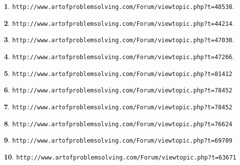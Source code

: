 \documentclass{article}
\theoremstyle{definition}
\newtheorem{s}{}
\begin{document}
	
	
	
	\begin{s}
		\texttt{http://www.artofproblemsolving.com/Forum/viewtopic.php?t=48538}.
	\end{s}
	
	
	
	
	\begin{s}
		\texttt{http://www.artofproblemsolving.com/Forum/viewtopic.php?t=44214}.
	\end{s}
	
	
	
	
	\begin{s}
		\texttt{http://www.artofproblemsolving.com/Forum/viewtopic.php?t=47030}.
	\end{s}
	
	
	
	
	\begin{s}
		\texttt{http://www.artofproblemsolving.com/Forum/viewtopic.php?t=47266}.
	\end{s}
	
	
	
	\begin{s}
		\texttt{http://www.artofproblemsolving.com/Forum/viewtopic.php?t=81412}
	\end{s}
	
	
	
	\begin{s}
		\texttt{http://www.artofproblemsolving.com/Forum/viewtopic.php?t=78452}
	\end{s}
	
	
	
	\begin{s}
		\texttt{http://www.artofproblemsolving.com/Forum/viewtopic.php?t=78452}
	\end{s}
	
	
	
	\begin{s}
		\texttt{http://www.artofproblemsolving.com/Forum/viewtopic.php?t=76624}
	\end{s}
	
	
	
	\begin{s}
		\texttt{http://www.artofproblemsolving.com/Forum/viewtopic.php?t=69709}
	\end{s}
	
	
	
	\begin{s}
		\texttt{http://www.artofproblemsolving.com/Forum/viewtopic.php?t=63671}
	\end{s}
	
\end{document}
